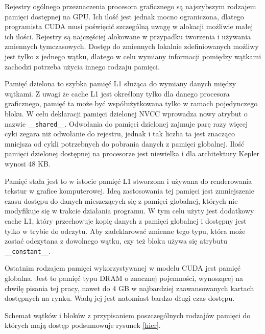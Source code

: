 Rejestry ogólnego przeznaczenia procesora graficznego są najszybszym rodzajem pamięci dostępnej na GPU.
Ich ilość jest jednak mocno ograniczona, dlatego programista CUDA musi poświęcić
szczególną uwagę w alokacji możliwie małej ich ilości. Rejestry są najczęściej alokowane
w przypadku tworzenia i używania zmiennych tymczasowych. Dostęp do zmiennych
lokalnie zdefiniowanych możliwy jest tylko z jednego wątku, dlatego w celu
wymiany informacji pomiędzy wątkami zachodzi potrzeba użycia innego rodzaju
pamięci.

Pamięć dzielona to szybka pamięć L1 służąca do wymiany danych między wątkami.
Z uwagi że cache L1 jest określony tylko dla danego procesora graficznego,
  pamięć ta może być współużytkowana tylko w ramach pojedynczego bloku. W celu
  deklaracji pamięci dzielonej NVCC wprowadza nowy atrybut o nazwie
  \texttt{\_\_shared\_\_}. Odwołania do pamięci dzielonej zajmuje parę razy
  więcej cyki zegara niż odwołanie do rejestru, jednak i tak liczba ta jest
  znacząco mniejsza od cykli potrzebnych do pobrania danych z pamięci globalnej.
  Ilość pamięci dzielonej dostępnej na procesorze jest niewielka i dla
  architektury Kepler wynosi 48 KB.

Pamięć stała jest to w istocie pamięć L1 stworzona i używana do renderowania tekstur 
w grafice komputerowej. Ideą zastosowania tej pamięci jest zmniejszenie czasu
dostępu do danych mieszczących się z pamięci globalnej, których nie modyfikuje się w trakcie działania programu.
W tym celu użyty jest dodatkowy cache L1, który przechowuje kopię danych 
z pamięci globalnej i dostępny jest tylko w trybie do odczytu.
Aby zadeklarować zmienne tego typu, która może zostać odczytana z dowolnego
wątku, czy też bloku używa się atrybutu \texttt{\_\_constant\_\_}.

Ostatnim rodzajem pamięci wykorzystywanej w modelu CUDA jest pamięć globalna.
Jest to pamięć typu DRAM o znacznej pojemności, wynoszącej na chwilę pisania tej
pracy, nawet do 4 GB w najbardziej zaawansowanych kartach dostępnych na rynku. 
Wadą jej jest natomiast bardzo długi czas dostępu.

Schemat wątków i bloków z przypisaniem poszczególnych rodzajów pamięci do których
mają dostęp podsumowuje rysunek \ref{hier}.

